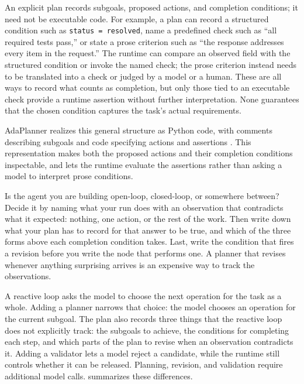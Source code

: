 An explicit plan records subgoals, proposed actions, and completion conditions; it need not be
executable code. For example, a plan can record a structured condition such as
\texttt{status = resolved}, name a predefined check such as ``all required tests pass,'' or
state a prose criterion such as ``the response addresses every item in the request.''
The runtime can compare an observed field with the structured condition or invoke the named check;
the prose criterion instead needs to be translated into a check or judged by a model or a human.
These are all ways to record what counts as completion, but only those tied to an executable
check provide a runtime assertion without further interpretation. None guarantees that the
chosen condition captures the task's actual requirements.

AdaPlanner realizes this general structure as Python code, with comments describing
subgoals and code specifying actions and assertions \citep[\S3.1]{sun2023adaplanner}.
This representation makes both the proposed actions and their completion conditions inspectable,
and lets the runtime evaluate the assertions rather than asking a model to interpret prose conditions.

\begin{foodforthought}
Is the agent you are building open-loop, closed-loop, or somewhere between? Decide it by naming what
your run does with an observation that contradicts what it expected: nothing, one action, or the
rest of the work. Then write down what your plan has to record for that answer to be true, and which
of the three forms above each completion condition takes. Last, write the condition that fires a
revision before you write the node that performs one. A planner that revises whenever anything
surprising arrives is an expensive way to track the observations.
\end{foodforthought}


A reactive loop asks the model to choose the next operation for the task as a whole. Adding a
planner narrows that choice: the model chooses an operation for the current subgoal. The plan also
records three things that the reactive loop does not explicitly track: the subgoals to achieve,
the conditions for completing each step, and which parts of the plan to revise when an observation
contradicts it. Adding a validator lets a model reject a candidate, while the runtime still controls
whether it can be released. Planning, revision, and validation require additional model calls.
 summarizes these differences.

